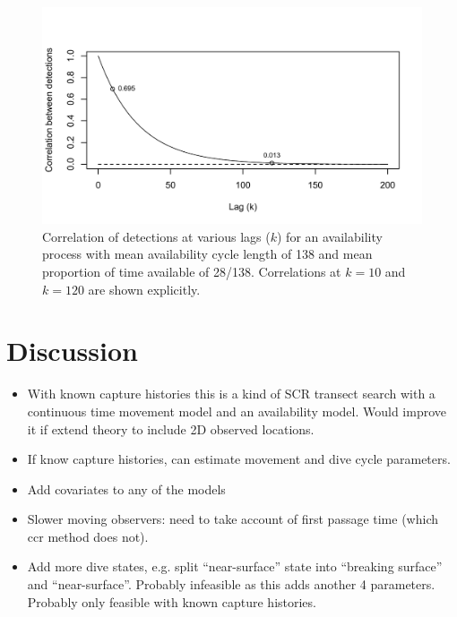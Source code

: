 \documentclass[useAMS, usenatbib, referee]{biom}
\begin{document}
\begin{figure}
\begin{center}
\includegraphics[width=12cm]{HMMcorr.pdf}
\caption{Correlation of detections at various lags ($k$) for an availability process with mean availability cycle length of 138 and mean proportion of time available of 28/138. Correlations at $k=10$ and $k=120$ are shown explicitly.  \label{fig:HMMcorr}}
\end{center}
\end{figure}

\section{Discussion\label{sec:discussion}}

\begin{itemize}

\item With known capture histories this is a kind of SCR transect search with a continuous time movement model and an availability model. Would improve it if extend theory to include 2D observed locations.

\item If know capture histories, can estimate movement and dive cycle parameters.

\item Add covariates to any of the models

\item Slower moving observers: need to take account of first passage time (which ccr method does not).

\item Add more dive states, e.g. split ``near-surface'' state into ``breaking surface'' and ``near-surface''. Probably infeasible as this adds another 4 parameters. Probably only feasible with known capture histories.

\end{itemize}
\end{document}

